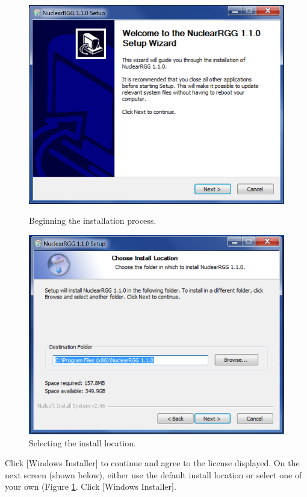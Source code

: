 \begin{figure}
\centering
\begin{minipage}{.40\textwidth}
  \centering
	\includegraphics[width=0.90\linewidth]{Images/windows-install-1.png}
	\caption{Beginning the installation process.}
	\label{fig:WindowsInstall1}
\end{minipage}%
\begin{minipage}{.40\textwidth}
  \centering
	\includegraphics[width=0.90\linewidth]{Images/windows-install-2.png}
	\caption{Selecting the install location.}
	\label{fig:WindowsInstall2}
\end{minipage}
\end{figure}

Click [Windows Installer] to continue and agree to the license displayed.  On the next screen (shown below), either use the default install location or select one of your own (Figure \ref{fig:WindowsInstall2}.  Click [Windows Installer].

